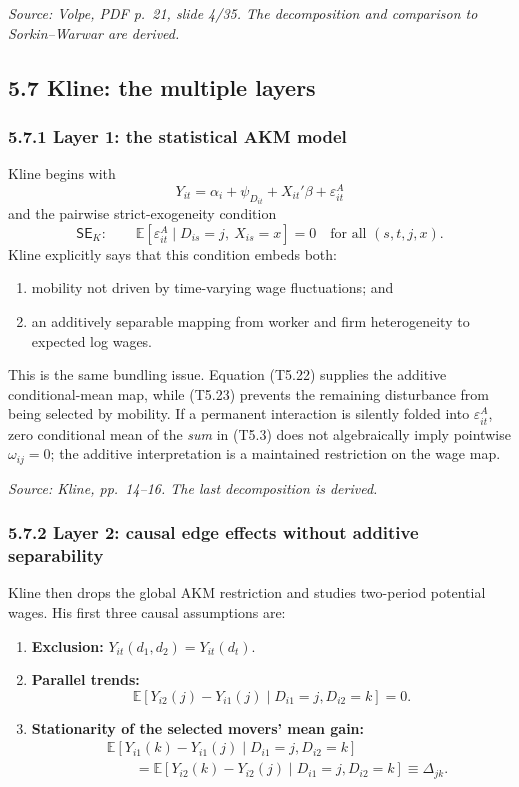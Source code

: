 \documentclass[11pt]{article}
\begin{document}
\textit{Source: Volpe, PDF p.\ 21, slide 4/35.  The decomposition and
comparison to Sorkin--Warwar are derived.}

\subsection{5.7 Kline: the multiple layers}

\subsubsection{5.7.1 Layer 1: the statistical AKM model}

Kline begins with
\[
Y_{it}
=
\alpha_i+\psi_{D_{it}}+X_{it}'\beta+\varepsilon^A_{it}
\tag{T5.22}
\]
and the pairwise strict-exogeneity condition
\[
\mathsf{SE}_{K}:
\qquad
\mathbb E[
\varepsilon^A_{it}
\mid
D_{is}=j,\ X_{is}=x
]
=0
\quad
\text{for all }(s,t,j,x).
\tag{T5.23}
\]
Kline explicitly says that this condition embeds both:

\begin{enumerate}
\item mobility not driven by time-varying wage fluctuations; and
\item an additively separable mapping from worker and firm heterogeneity to
  expected log wages.
\end{enumerate}

This is the same bundling issue.  Equation (T5.22) supplies the additive
conditional-mean map, while (T5.23) prevents the remaining disturbance from
being selected by mobility.  If a permanent interaction is silently folded
into \(\varepsilon^A_{it}\), zero conditional mean of the \emph{sum} in
(T5.3) does not algebraically imply pointwise
\(\omega_{ij}=0\); the additive interpretation is a maintained restriction
on the wage map.

\textit{Source: Kline, pp.\ 14--16.  The last decomposition is derived.}

\subsubsection{5.7.2 Layer 2: causal edge effects without additive
separability}

Kline then drops the global AKM restriction and studies two-period potential
wages.  His first three causal assumptions are:

\begin{enumerate}
\item \textbf{Exclusion:}
  \(Y_{it}(d_1,d_2)=Y_{it}(d_t)\).
\item \textbf{Parallel trends:}
  \[
  \mathbb E[
  Y_{i2}(j)-Y_{i1}(j)
  \mid
  D_{i1}=j,D_{i2}=k
  ]
  =0.
  \tag{T5.24}
  \]
\item \textbf{Stationarity of the selected movers' mean gain:}
  \[
  \begin{aligned}
  &\mathbb E[
  Y_{i1}(k)-Y_{i1}(j)
  \mid D_{i1}=j,D_{i2}=k]\\
  &\qquad =
  \mathbb E[
  Y_{i2}(k)-Y_{i2}(j)
  \mid D_{i1}=j,D_{i2}=k]
  \equiv\Delta_{jk}.
  \end{aligned}
  \tag{T5.25}
  \]
\end{enumerate}
\end{document}
